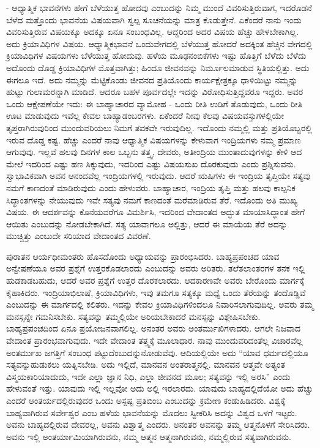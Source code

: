 - ಆಧ್ಯಾತ್ಮಿಕ ಭಾವನೆಗಳು ಹೇಗೆ ಬೆಳೆಯುತ್ತ ಹೋದವು ಎಂಬುದನ್ನು ನಿಮ್ಮ ಮುಂದೆ ವಿವರಿಸುತ್ತಿರುವಾಗ, ಇದರೊಡನೆ ಬೆಳೆದ ಮತ್ತೊಂದು ಭಾವನೆಯ ವಿಷಯವಾಗಿ ಸ್ವಲ್ಪ ಸೂಚನೆಯನ್ನು ಮಾತ್ರ ಕೊಡುತ್ತೇನೆ. ಏಕೆಂದರೆ ನಾನು ಇಂದು ವಿವರಿಸುತ್ತಿರುವ ವಿಷಯಕ್ಕೂ ಅದಕ್ಕೂ ಏನೂ ಸಂಬಂಧವಿಲ್ಲ. ಆದ್ದರಿಂದ ಅದರ ವಿಷಯ ಹೆಚ್ಚು ಹೇಳಬೇಕಾಗಿಲ್ಲ. ಅದು ಕ್ರಿಯಾವಿಧಿಗಳ ವಿಷಯ. ಆಧ್ಯಾತ್ಮಿಕಭಾವನೆ ಒಂದು\break ವೇಗದಲ್ಲಿ ಬೆಳೆಯುತ್ತ ಹೋದರೆ ಅದಕ್ಕಿಂತ ಹೆಚ್ಚಿನ ವೇಗದಲ್ಲಿ ಕ್ರಿಯಾವಿಧಿಗಳ ವಿಷಯಗಳು ಬೆಳೆಯುತ್ತ ಹೋದುವು. ಹಳೆಯ ಮೂಢನಂಬಿಕೆಗಳು ಇಷ್ಟು ಹೊತ್ತಿಗೆ ಬೆಳೆದು ಬೆಳೆದು ಅದೊಂದು ದೊಡ್ಡ ಕ್ರಿಯಾವಿಧಿಗಳ ಮೊತ್ತವಾಗಿತ್ತು; ಹಿಂದೂ ಜೀವನವನ್ನು ನಿರ್ಮೂಲಮಾಡುವ ಸ್ಥಿತಿಯಲ್ಲಿತ್ತು. ಅದು ಈಗಲೂ ಇದೆ. ಅದು ನಮ್ಮನ್ನು ಮೆಟ್ಟಿಕೊಂಡು ಜೀವನದ ಪ್ರತಿಯೊಂದು ಕಾರ್ಯಕ್ಷೇತ್ರಕ್ಕೂ ಧಾಳಿಯಿಟ್ಟು ನಮ್ಮನ್ನು ಹುಟ್ಟು ಗುಲಾಮರನ್ನಾಗಿ ಮಾಡಿದೆ. ಆದರೂ ಬಹಳ ಪೂರ್ವದಲ್ಲೇ ಇದನ್ನು ವಿರೋಧಿಸುತ್ತಿದ್ದವರೂ ಇದ್ದರು. ಅವರ ಒಂದು ಆಕ್ಷೇಪಣೆಯೇ ಇದು: ಈ ಬಾಹ್ಯಾಚಾರದ ವ್ಯಾಮೋಹ - ಒಂದು ರೀತಿ ಉಡಿಗೆ ತೊಡುವುದು, ಒಂದು ರೀತಿ ಊಟ ಮಾಡುವುದು ಇವೆಲ್ಲ ಕೇವಲ ಬಾಹ್ಯಾಡಂಬರಗಳು. ಏಕೆಂದರೆ ನೀವು ಕೆಲವು ವಿಷಯವಸ್ತುಗಳಲ್ಲಿಯೇ ತೃಪ್ತರಾಗಿರುವುರಿಂದ ಮುಂದುವರಿಯಲು ನಿಮಗೆ ತವಕವೇ ಇರುವುದಿಲ್ಲ. ಇದೊಂದು ನಮ್ಮಲ್ಲಿ ಮತ್ತು ಪ್ರತಿಯೊಬ್ಬರಲ್ಲಿ ಇರುವ ದೊಡ್ಡ ಕಷ್ಟ. ಹೆಚ್ಚು ಎಂದರೆ ನಾವು ಆಧ್ಯಾತ್ಮಿಕ ವಿಷಯಗಳನ್ನು ಕೇಳುವಾಗ ಇಂದ್ರಿಯಗಳು ನಮ್ಮ ಪ್ರಮಾಣ ಆಗುವುವು. ಇಲ್ಲವೆ ಹಲವು ದಿನಗಳ ಕಾಲ ಒಬ್ಬನು ತತ್ತ್ವ, ದೇವರು, ಅತೀಂದ್ರಿಯ ಮುಂತಾದುವುಗಳನ್ನು ಕೇಳಿ ಆದ ಮೇಲೆ ಇದರಿಂದ ಎಷ್ಟು ಹಣ ಸಿಕ್ಕುವುದು, ಇದರಿಂದ ಎಷ್ಟು ವಿಷಯಸುಖ ದೊರಕುವುದು ಎಂದು ಪ್ರಶ್ನಿಸುವನು. ಸ್ವಾಭಾವಿಕವಾಗಿ ಅವನ ಆನಂದವೆಲ್ಲ ಇಂದ್ರಿಯಗಳಲ್ಲಿ ಇರುವುದು. ಆದರೆ ಋಷಿಗಳು ಈ ಇಂದ್ರಿಯ ತೃಪ್ತಿಯೇ ಸತ್ಯವು ನಮಗೆ ಕಾಣದಂತೆ ಮಾಡಿರುವುದು ಎಂದು ಹೇಳುವರು. ಬಾಹ್ಯಾಚಾರ, ಇಂದ್ರಿಯ ತೃಪ್ತಿ ಮತ್ತು ಹಲವು ಕಾಲ್ಪನಿಕ ಸಿದ್ಧಾಂತಗಳನ್ನು ನೇಯುವುದು ಇವೇ ಸತ್ಯವು ನಮಗೆ ಕಾಣದಂತೆ ಮರೆಮಾಡಿರುವ ತೆರೆ. ಇದೊಂದು ಅತಿ ಮುಖ್ಯ ವಿಷಯ. ಈ ಆದರ್ಶವನ್ನು ಕೊನೆಯವರೆಗೂ ವಿಮರ್ಶಿಸಿ, ಇದರಿಂದ ವೇದಾಂತದ ಅದ್ಭುತ ಮಾಯಾಸಿದ್ಧಾಂತ ಹೇಗೆ ಆಯಿತು ಎಂಬುದನ್ನು ನೋಡಬೇಕಾಗಿದೆ. ಸತ್ಯ ಯಾವಾಗಲೂ ಅಲ್ಲಿತ್ತು, ಆದರೆ ಈ ಮಾಯೆಯ ತೆರೆ ಅದನ್ನು ಮುಚ್ಚಿತ್ತು ಎಂಬುದೇ ಸರಿಯಾದ ವೇದಾಂತದ ವಿವರಣೆ.

ಪುರಾತನ ಆರ್ಯಧೀಮಂತರು ಹೊಸದೊಂದು ಅಧ್ಯಾಯವನ್ನು ಪ್ರಾರಂಭಿಸಿದರು. ಬಾಹ್ಯಪ್ರಪಂಚದ ಯಾವ ಅನ್ವೇಷಣೆಯೂ ಅವರ ಪ್ರಶ್ನೆಗೆ ಉತ್ತರ\break ಕೊಡಲಾರದು ಎಂಬುದನ್ನು ಅವರು ಅರಿತರು. ತಲೆತಲಾಂತರಗಳ ತನಕ ಇಲ್ಲಿ ಹುಡಕಾಡಬಹುದು, ಆದರೆ ಅವರ ಪ್ರಶ್ನೆಗೆ ಉತ್ತರ ದೊರಕಲಾರದು. ಆದಕಾರಣವೇ ಅವರು ಬೇರೊಂದು ಮಾರ್ಗಕ್ಕೆ ಕೈಹಾಕಿದರು. ಇಂದ್ರಿಯಾಭಿಲಾಷೆ, ಕ್ರಿಯಾವಿಧಿಗಳು, ಇವು ತಮಗೂ ಸತ್ಯಕ್ಕೂ ಮಧ್ಯೆ ಒಂದು ತೆರೆಯನ್ನು ತಂದೊಡ್ಡಿವೆ ಎಂಬುದನ್ನು ಈ ಮಾರ್ಗದಲ್ಲಿ ಕಲಿತರು. ಇದನ್ನು ಕೇವಲ ಕ್ರಿಯಾವಿಧಿಗಳಿಂದಲೂ ನಿವಾರಿಸಲಾಗುವುದಿಲ್ಲ. ಅವರು ತಮ್ಮ ಮನಸ್ಸನ್ನೇ ಗಮನಿಸಬೇಕು. ಸತ್ಯವನ್ನು ತಮ್ಮಲ್ಲಿಯೇ ಅರಿಯಬೇಕಾದರೆ ಮನಸ್ಸನ್ನು ವಿಶ್ಲೇಷಿಸಬೇಕು. ಬಾಹ್ಯಪ್ರಪಂಚದಿಂದ ಏನೂ ಪ್ರಯೋಜನವಾಗಲಿಲ್ಲ. ಅನಂತರ ಅವರು ಅಂತರ್ಮುಖಿಗಳಾದರು. ಆಗಲೇ ನಿಜವಾದ ವೇದಾಂತ ಪ್ರಾರಂಭವಾಗುವುದು. ಇದೇ ವೇದಾಂತ ತತ್ತ್ವಕ್ಕೆ ಮೂಲಾಧಾರ. ನಾವು ಮುಂದುವರಿದಂತೆಲ್ಲ ವಿಚಾರವೆಲ್ಲ ಅಂತರ್ಮುಖ ಜಗತ್ತಿಗೆ ಸಂಬಂಧ ಪಟ್ಟುದೆಂಬುದನ್ನು\break ನೋಡುವೆವು. ಆದಿಯಲ್ಲಿಯೇ ಅದು “ಯಾವ ಧರ್ಮದಲ್ಲಿಯೂ ಸತ್ಯವನ್ನು\break ಹುಡುಕಲು ಯತ್ನಿಸಬೇಡಿ. ಅದು ಇಲ್ಲಿದೆ, ಮಾನವನ ಅಂತರಾತ್ಮನಲ್ಲಿ. ಮಾನವನ ಆತ್ಮವೇ ಅತ್ಯಂತ ವಿಸ್ಮಯಕಾರಿಯಾದುದು, ಇದೇ ಎಲ್ಲಾ ಜ್ಞಾನ ನಿಧಿ, ಎಲ್ಲಾ ಜೀವನದ ಮೂಲ; ಸತ್ಯವನ್ನು ಇಲ್ಲಿ ಅರಸಿ'' ಎಂದು ಹೇಳುವಂತೆ ಇತ್ತು. ಯಾವುದು ಇಲ್ಲಿ ಇಲ್ಲವೋ ಅದು ಅಲ್ಲಿ ಇರಲಾರದು. ಯಾವುದು ಬಾಹ್ಯದಲ್ಲಿದೆಯೋ ಅದು ಹೆಚ್ಚು ಎಂದರೆ ಆಂತರ್ಯದಲ್ಲಿರುವುದರ ಒಂದು ಅಸ್ಪಷ್ಟ ಪ್ರತಿಬಿಂಬ ಎಂಬುದನ್ನು ಕ್ರಮೇಣ ಕಂಡುಹಿಡಿದರು. ವಿಶ್ವಕ್ಕೆ ಬಾಹ್ಯವಾಗಿರುವ ಸರ್ವೇಶ್ವರ ಎಂಬ ಹಳೆಯ ಭಾವನೆಯನ್ನು ಮೊದಲು ಸ್ವೀಕರಿಸಿ ಅದನ್ನು ವಿಶ್ವದ ಒಳಗೆ ಇಟ್ಟರು. ಅವನು ಬಾಹ್ಯದಲ್ಲಿರುವ ದೇವರಲ್ಲ, ಅವನು ವಿಶ್ವಾತ್ಮ ಎಂದರು. ಅನಂತರ ಅವನನ್ನು ತಮ್ಮ ಆತ್ಮನೊಳಗೆ ಸೇರಿಸಿದರು. ಅವನು ಇಲ್ಲಿ ಅಂತರ್ಯಾಮಿಯಾಗಿರುವನು, ನಮ್ಮ ಆತ್ಮನ ಆತ್ಮನಾಗಿರುವನು, ನಮ್ಮಲ್ಲಿರುವ ಸತ್ಯವಾಗಿರುವನು.

